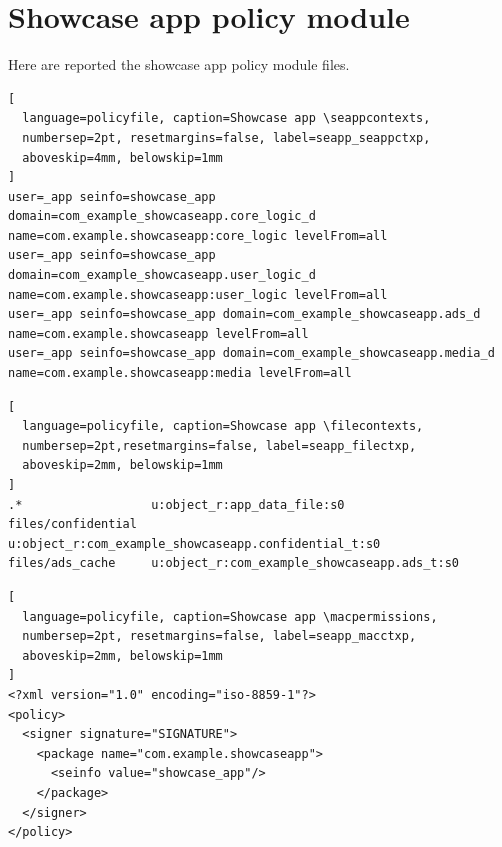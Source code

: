 

\newpage


\section[Policy module]{Showcase app policy module}\label{appendix:seapp_policy}

Here are reported the showcase app policy module files.
\begin{lstlisting}[
  language=policyfile, caption=Showcase app \seappcontexts,
  numbersep=2pt, resetmargins=false, label=seapp_seappctxp,
  aboveskip=4mm, belowskip=1mm
]
user=_app seinfo=showcase_app domain=com_example_showcaseapp.core_logic_d name=com.example.showcaseapp:core_logic levelFrom=all
user=_app seinfo=showcase_app domain=com_example_showcaseapp.user_logic_d name=com.example.showcaseapp:user_logic levelFrom=all
user=_app seinfo=showcase_app domain=com_example_showcaseapp.ads_d name=com.example.showcaseapp levelFrom=all
user=_app seinfo=showcase_app domain=com_example_showcaseapp.media_d name=com.example.showcaseapp:media levelFrom=all
\end{lstlisting}
\begin{lstlisting}[
  language=policyfile, caption=Showcase app \filecontexts,
  numbersep=2pt,resetmargins=false, label=seapp_filectxp,
  aboveskip=2mm, belowskip=1mm
]
.*                  u:object_r:app_data_file:s0
files/confidential  u:object_r:com_example_showcaseapp.confidential_t:s0
files/ads_cache     u:object_r:com_example_showcaseapp.ads_t:s0
\end{lstlisting}
\begin{lstlisting}[
  language=policyfile, caption=Showcase app \macpermissions,
  numbersep=2pt, resetmargins=false, label=seapp_macctxp,
  aboveskip=2mm, belowskip=1mm
]
<?xml version="1.0" encoding="iso-8859-1"?>
<policy>
  <signer signature="SIGNATURE">
    <package name="com.example.showcaseapp">
      <seinfo value="showcase_app"/>
    </package>
  </signer>
</policy>
\end{lstlisting}
